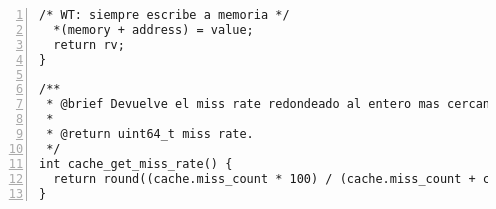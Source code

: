 \documentclass[11pt,a4paper, spanish]{article}
\begin{document}
\begin{lstlisting}[numbers=left, tabsize=2, basicstyle=\fontsize{11}{13}\ttfamily, frame=single, caption={makefile}]
  /* WT: siempre escribe a memoria */
  *(memory + address) = value;
  return rv;
}

/**
 * @brief Devuelve el miss rate redondeado al entero mas cercano.
 *
 * @return uint64_t miss rate.
 */
int cache_get_miss_rate() {
  return round((cache.miss_count * 100) / (cache.miss_count + cache.hit_count));
}

\end{lstlisting}
\end{document}
